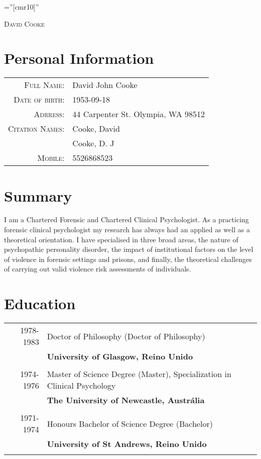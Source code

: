 \documentclass [a4paper,10pt]{article}
\begin{document}
\pagestyle{empty} %

\font\fb=''[cmr10]'' %

\par{\centering
		{\Huge   \textsc{David Cooke}
	}\bigskip\par}


\section{Personal Information}

\begin{tabular}{rl}
    \textsc{Full Name:} & David John Cooke \\
    \textsc{Date of birth:} & 1953-09-18 \\
    \textsc{Adrress:}   & 44 Carpenter St.
    Olympia, WA 98512\\
    \textsc{Citation Names:}   & Cooke, David \\ & Cooke, D. J \\ 
    \textsc{Mobile:}     & 5526868523\\
\end{tabular}

\section{Summary}
I am a Chartered Forensic and Chartered Clinical Psychologist. As a practicing forensic clinical psychologist my research has always had an applied as well as a theoretical orientation. I have specialised in three broad areas, the nature of psychopathic personality disorder, the impact of institutional factors on the level of violence in forensic settings and prisons, and finally, the theoretical challenges of carrying out valid violence risk assessments of individuals. 

\section{Education}
\begin{tabular}{r p{11cm}}	
\\
\textsc{1978-1983} & Doctor of Philosophy (Doctor of Philosophy) \\ & \textbf{University of Glasgow, Reino Unido}\\
\\\textsc{1974-1976} & Master of Science Degree (Master), Specialization in Clinical Psychology  \\ & \textbf{The University of Newcastle, Austrália}\\
\\\textsc{1971-1974} & Honours Bachelor of Science Degree (Bachelor) \\ & \textbf{University of St Andrews, Reino Unido}\\
\\
\end{tabular}
\end{document}
